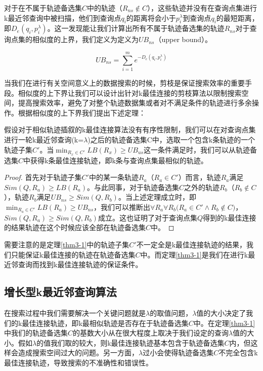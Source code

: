 对于在不属于轨迹备选集$C$中的轨迹（$R_{ns} \notin C$），这些轨迹并没有在查询点集进行k最近邻查询中被扫描，他们到查询点$q_{i}$的距离将会小于$p_{i}^{\lambda}$到查询点$q_{i}$的最短距离，即$D_{e}(q_{i}, p_{i}^{\lambda})$。这一发现能让我们计算出所有不属于轨迹备选集的轨迹$R_{ns}$对于查询点集的相似度的上界，我们定义为定义为$UB_{ns}$（upper bound）。

\begin{equation}
	\label{eq3-8}
	UB_{ns} = \sum_{i=1}^{m}e^{-D_{e}(q_{i}, p_{i}^{\lambda})}
\end{equation}

当我们在进行有关空间意义上的数据搜索的时候，剪枝是保证搜索效率的重要手段。相似度的上下界让我们可以设计出针对k最佳连接的剪枝算法以限制搜索空间，提高搜索效率，避免了对整个轨迹数据集或者对不满足条件的轨迹进行多余操作。根据相似度的上下界我们提出下述定理：
\\

\begin{thm}[相似度上下界]
	\label{thm3-1}
	假设对于相似轨迹插叙的k最佳连接算法没有有序性限制，我们可以在对查询点集进行一轮k最近邻查询(k=$\lambda$)之后的轨迹备选集C中，选取一个包含k条轨迹的一个轨迹子集$C'$。当$\min_{R_{x}\in C'}{LB(R_{x})}\geq UB_{us}$这一条件满足时，我们可以从轨迹备选集$C$中获得k条最佳连接轨迹，即k条与查询点集最相似的轨迹。
	\begin{proof}
	首先对于轨迹子集$C'$中的某一条轨迹$R_{a}$（$R_{a} \in C'$）而言，轨迹$R_{a}$满足$Sim(Q,R_{a}) \geq LB(R_{a})$。与此同事，对于轨迹备选集$C$之外的轨迹$R_{b}$（$R_{b} \notin C$），轨迹$R_{b}$满足$UB_{ns} \geq Sim(Q,R_{b})$。当上述定理成立时，即$\min_{R_{a}\in C'}{LB(R_{a})}\geq UB_{ns}$，我们可以推断出$\forall R_{a}\forall R_{b} \big( R_{a} \in C' \wedge R_{b} \notin C \big)$，$Sim(Q,R_{a}) \geq Sim(Q,R_{b})$成立。这也证明了对于查询点集$Q$得到的k最佳连接的结果轨迹在这个时候应该全部在轨迹备选集$C$中。
	\end{proof}
\end{thm}

需要注意的是定理\ref{thm3-1}中的轨迹子集$C'$不一定全是k最佳连接轨迹的结果，我们只能保证k最佳连接的轨迹在轨迹备选集$C$中。而定理\ref{thm3-1}是我们在进行k最近邻查询而找到k最佳连接轨迹的保证条件。
\\

\subsection{增长型k最近邻查询算法}
\label{subsec:iknn}
在搜索过程中我们需要解决一个关键问题就是$\lambda$的取值问题，$\lambda$值的大小决定了我们的k最佳连接轨迹，即k最相似轨迹是否存在于轨迹备选集$C$中。在定理\ref{thm3-1}中我们的轨迹备选集$C$的基数大小从在很大程度上取决于我们设定的查询$\lambda$值的大小。假如$\lambda$的值我们取的较大，则k最佳连接轨迹基本包含于轨迹备选集$C$内，但这样会造成搜索空间过大的问题。另一方面，$\lambda$过小会使得轨迹备选集$C$不完全包含k最佳连接轨迹，导致搜索的不准确性和错误性。
\\

